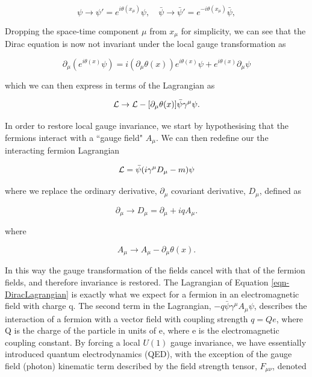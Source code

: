 \begin{equation}
\psi \to \psi'= e^{i \theta(x_{\mu})}\psi, \quad \bar{\psi} \to \bar{\psi}' = e^{- i \theta(x_{\mu})}\bar{\psi},
\end{equation} 

Dropping the space-time component $\mu$ from $x_{\mu}$ for simplicity, we can see that the Dirac equation is now not invariant under the local 
gauge transformation as

\begin{equation}
\partial_{\mu} (e^{i\theta(x)}\psi) = i(\partial_{\mu}\theta(x))e^{i\theta(x)}\psi + e^{i\theta(x)} \partial_{\mu}\psi 
\end{equation}

which we can then express in terms of the Lagrangian as

\begin{equation}
\mathcal{L} \to \mathcal{L} - [\partial_{\mu} \theta(x)] \bar{\psi} \gamma^{\mu} \psi.
\end{equation}

In order to restore local gauge invariance, we start by hypothesising that the fermions interact with a ``gauge field" $A_{\mu}$. We can then 
redefine our the interacting fermion Lagrangian 

\begin{equation} 
\mathcal{L} = \bar{\psi}(i \gamma^{\mu}D_{\mu}-m)\psi
\end{equation}

where we replace the ordinary derivative, $\partial_{\mu}$ covariant derivative, $D_{\mu}$, defined as

\begin{equation}
\partial_{\mu} \to D_{\mu} = \partial_{\mu} + iqA_{\mu}.
\end{equation}

where

\begin{equation}
A_{\mu} \to A_{\mu} - \partial_{\mu} \theta (x).
\end{equation}

In this way the gauge transformation of the fields cancel with that of the fermion fields, and therefore invariance is restored. The Lagrangian 
of Equation \ref{eqn-DiracLagrangian} is exactly what we expect for a fermion in an electromagnetic field with charge q. The second term in the 
Lagrangian, $-q\bar{\psi}\gamma^{\mu}A_{\mu}\psi$, describes the interaction of a fermion with a vector field with coupling strength $q=Qe$, 
where Q is the charge of the particle in units of e, where e is the electromagnetic coupling constant. By forcing a local $U(1)$ gauge 
invariance, we have essentially introduced quantum electrodynamics (QED), with the exception of the gauge field (photon) kinematic term 
described by the field strength tensor, $F_{\mu \nu}$, denoted  

